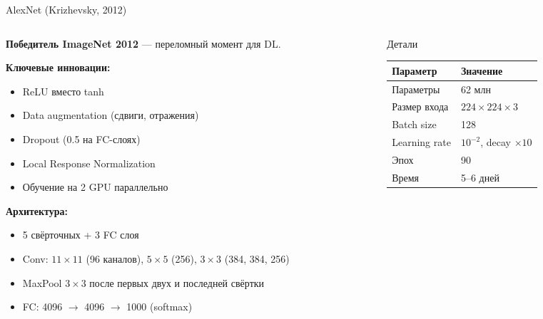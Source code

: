 \documentclass[aspectratio=169, 9pt]{beamer}
\begin{document}
\begin{frame}{AlexNet (Krizhevsky, 2012)}
  \begin{columns}[T]
    \begin{column}{0.5\textwidth}
      \textbf{Победитель ImageNet 2012} — переломный момент для DL.
      
      \vspace{0.3em}
      \textbf{Ключевые инновации:}
      \begin{itemize}
        \item ReLU вместо tanh
        \item Data augmentation (сдвиги, отражения)
        \item Dropout (0.5 на FC-слоях)
        \item Local Response Normalization
        \item Обучение на 2 GPU параллельно
      \end{itemize}
      
      \vspace{0.3em}
      \textbf{Архитектура:}
      \begin{itemize}
        \item 5 свёрточных + 3 FC слоя
        \item Conv: $11\times11$ (96 каналов), $5\times5$ (256), $3\times3$ (384, 384, 256)
        \item MaxPool $3\times3$ после первых двух и последней свёртки
        \item FC: 4096 $\to$ 4096 $\to$ 1000 (softmax)
      \end{itemize}
    \end{column}
    \begin{column}{0.5\textwidth}
      \begin{block}{Детали}
        \centering
        \begin{tabular}{ll}
          \toprule
          Параметр & Значение \\
          \midrule
          Параметры & 62 млн \\
          Размер входа & $224\times224\times3$ \\
          Batch size & 128 \\
          Learning rate & $10^{-2}$, decay $\times 10$ \\
          Эпох & 90 \\
          Время & 5--6 дней \\
          \bottomrule
        \end{tabular}
      \end{block}
      

\end{column}
\end{columns}
\end{frame}
\end{document}
